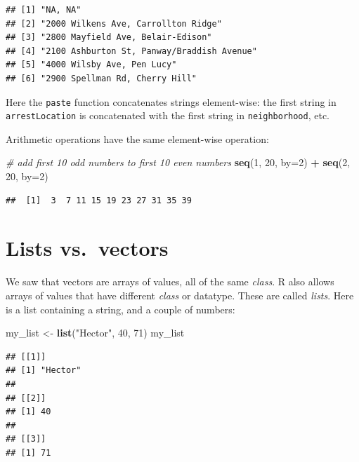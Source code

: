 \documentclass[12pt,]{book}
\newenvironment{Shaded}{\begin{snugshade}}{\end{snugshade}}
\newcommand{\KeywordTok}[1]{\textcolor[rgb]{0.13,0.29,0.53}{\textbf{#1}}}
\newcommand{\DataTypeTok}[1]{\textcolor[rgb]{0.13,0.29,0.53}{#1}}
\newcommand{\DecValTok}[1]{\textcolor[rgb]{0.00,0.00,0.81}{#1}}
\newcommand{\StringTok}[1]{\textcolor[rgb]{0.31,0.60,0.02}{#1}}
\newcommand{\CommentTok}[1]{\textcolor[rgb]{0.56,0.35,0.01}{\textit{#1}}}
\newcommand{\OperatorTok}[1]{\textcolor[rgb]{0.81,0.36,0.00}{\textbf{#1}}}
\newcommand{\NormalTok}[1]{#1}
\theoremstyle{definition}
\theoremstyle{definition}
\theoremstyle{definition}
\theoremstyle{remark}
\begin{document}
\begin{verbatim}
## [1] "NA, NA"                                   
## [2] "2000 Wilkens Ave, Carrollton Ridge"       
## [3] "2800 Mayfield Ave, Belair-Edison"         
## [4] "2100 Ashburton St, Panway/Braddish Avenue"
## [5] "4000 Wilsby Ave, Pen Lucy"                
## [6] "2900 Spellman Rd, Cherry Hill"
\end{verbatim}

Here the \texttt{paste} function concatenates strings element-wise: the
first string in \texttt{arrestLocation} is concatenated with the first
string in \texttt{neighborhood}, etc.

Arithmetic operations have the same element-wise operation:

\begin{Shaded}
\begin{Highlighting}[]
\CommentTok{# add first 10 odd numbers to first 10 even numbers}
\KeywordTok{seq}\NormalTok{(}\DecValTok{1}\NormalTok{, }\DecValTok{20}\NormalTok{, }\DataTypeTok{by=}\DecValTok{2}\NormalTok{) }\OperatorTok{+}\StringTok{ }\KeywordTok{seq}\NormalTok{(}\DecValTok{2}\NormalTok{, }\DecValTok{20}\NormalTok{, }\DataTypeTok{by=}\DecValTok{2}\NormalTok{)}
\end{Highlighting}
\end{Shaded}

\begin{verbatim}
##  [1]  3  7 11 15 19 23 27 31 35 39
\end{verbatim}

\section{Lists vs.~vectors}\label{lists-vs.vectors}

We saw that vectors are arrays of values, all of the same \emph{class}.
R also allows arrays of values that have different \emph{class} or
datatype. These are called \emph{lists}. Here is a list containing a
string, and a couple of numbers:

\begin{Shaded}
\begin{Highlighting}[]
\NormalTok{my_list <-}\StringTok{ }\KeywordTok{list}\NormalTok{(}\StringTok{"Hector"}\NormalTok{, }\DecValTok{40}\NormalTok{, }\DecValTok{71}\NormalTok{)}
\NormalTok{my_list}
\end{Highlighting}
\end{Shaded}

\begin{verbatim}
## [[1]]
## [1] "Hector"
## 
## [[2]]
## [1] 40
## 
## [[3]]
## [1] 71
\end{verbatim}
\end{document}
